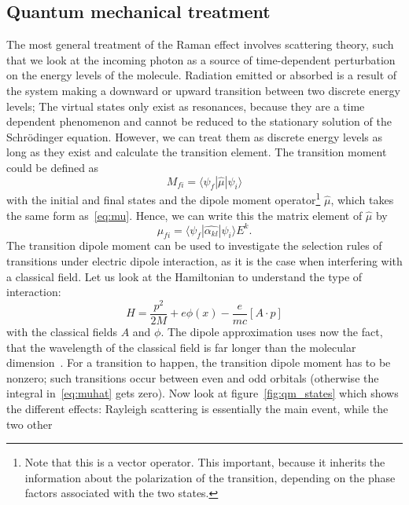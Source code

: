 \subsection{Quantum mechanical treatment}
\label{sub:quantum_mechanical_treatment}
The most general treatment of the Raman effect involves scattering theory, such that we look at the incoming 
photon as a source of time-dependent perturbation on the energy levels of the molecule. Radiation emitted or absorbed is 
a result of the system making a downward or upward transition between two discrete energy levels; The virtual states only
exist as resonances, because they are a time dependent phenomenon and cannot be reduced to the stationary solution of 
the Schrödinger equation. However, we can treat them as discrete energy levels as long as they exist and calculate the
transition element. The transition moment could be defined as
\begin{equation}
    M_{fi} = \langle \psi_f | \hat{\mu} | \psi_i \rangle 
\end{equation}
with the initial and final states and the dipole moment operator\footnote{Note that this is a vector operator. This 
important, because it inherits the information about the polarization of the transition, depending on the phase factors
associated with the two states.}
$\hat{\mu}$, which takes the same
form as~\eqref{eq:mu}. Hence, we can write this the matrix element of $\hat{\mu}$ by
\begin{equation}
    \label{eq:muhat}
    \mu_{fi} = \langle \psi_f | \hat{\alpha_{kl}} | \psi_i \rangle E^k.
\end{equation}
The transition dipole moment can be used to investigate the selection rules of transitions under electric
dipole interaction, as it is the case when interfering with a classical field. Let us look at the Hamiltonian
to understand the type of interaction:
\begin{equation}
    H = \frac{p^2}{2M} + e\phi(x) - \frac{e}{mc}[A \cdot p]
\end{equation}
with the classical fields $A$ and $\phi$. The dipole approximation uses now the fact, that
the wavelength of the classical field is far longer than the molecular dimension~\cite{sakurai2011modern}.
For a transition to happen, the transition dipole moment has to be nonzero; such transitions occur between
even and odd orbitals (otherwise the integral in~\eqref{eq:muhat} gets zero). Now look at figure~\ref{fig:qm_states}
which shows the different effects: Rayleigh scattering is essentially the main event, while the two other 
